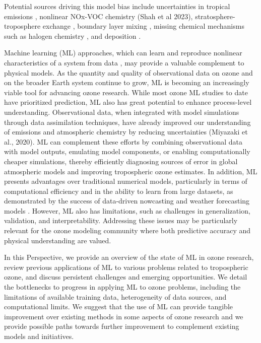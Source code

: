 \documentclass[gmd, manuscript]{copernicus}
\begin{document}
Potential sources driving this model bias include uncertainties in tropical emissions \citep{zhang_contributions_2021}, nonlinear NOx-VOC chemistry (Shah et al 2023), stratosphere-troposphere exchange \citep{neu_tropospheric_2014}, boundary layer mixing \citep{lu_exploring_2019}, missing chemical mechanisms such as halogen chemistry \citep{wang_active_2015}, and deposition \citep{clifton_dry_2020}. 

Machine learning (ML) approaches, which can learn and reproduce nonlinear characteristics of a system from data \citep{hornik_multilayer_1989}, may provide a valuable complement to physical models. As the quantity and quality of observational data on ozone \citep{Schultz2017} and on the broader Earth system \citep{doi:10.1080/17538947.2016.1250829,reichstein_deep_2019} continue to grow, ML is becoming an increasingly viable tool for advancing ozone research. While most ozone ML studies to date have prioritized prediction, ML also has great potential to enhance process-level understanding. Observational data, when integrated with model simulations through data assimilation techniques, have already improved our understanding of emissions and atmospheric chemistry by reducing uncertainties (Miyazaki et al., 2020). ML can complement these efforts by combining observational data with model outputs, emulating model components, or enabling computationally cheaper simulations, thereby efficiently diagnosing sources of error in global atmospheric models and improving tropospheric ozone estimates. In addition, ML presents advantages over traditional numerical models, particularly in terms of computational efficiency and in the ability to learn from large datasets, as demonstrated by the success of data-driven nowcasting and weather forecasting models \citep{bi_accurate_2023, lam_learning_2023, price_gencast_2024}. However, ML also has limitations, such as challenges in generalization, validation, and interpretability. Addressing these issues may be particularly relevant for the ozone modeling community where both predictive accuracy and physical understanding are valued.
 
In this Perspective, we provide an overview of the state of ML in ozone research, review previous applications of ML to various problems related to tropospheric ozone, and discuss persistent challenges and emerging opportunities. We detail the bottlenecks to progress in applying ML to ozone problems, including the limitations of available training data, heterogeneity of data sources, and computational limits. We suggest that the use of ML can provide tangible improvement over existing methods in some aspects of ozone research and we provide possible paths towards further improvement to complement existing models and initiatives.
\end{document}
